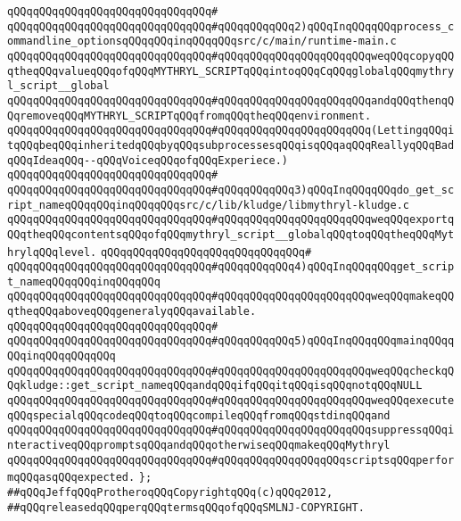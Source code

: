 \verb|qQQqqQQqqQQqqQQqqQQqqQQqqQQqqQQq#|\newline
\verb|qQQqqQQqqQQqqQQqqQQqqQQqqQQqqQQq#qQQqqQQqqQQq2)qQQqInqQQqqQQqprocess_commandline_optionsqQQqqQQqinqQQqqQQqsrc/c/main/runtime-main.c|\newline
\verb|qQQqqQQqqQQqqQQqqQQqqQQqqQQqqQQq#qQQqqQQqqQQqqQQqqQQqqQQqweqQQqcopyqQQqtheqQQqvalueqQQqofqQQqMYTHRYL_SCRIPTqQQqintoqQQqCqQQqglobalqQQqmythryl_script__global|\newline
\verb|qQQqqQQqqQQqqQQqqQQqqQQqqQQqqQQq#qQQqqQQqqQQqqQQqqQQqqQQqandqQQqthenqQQqremoveqQQqMYTHRYL_SCRIPTqQQqfromqQQqtheqQQqenvironment.|\newline
\verb|qQQqqQQqqQQqqQQqqQQqqQQqqQQqqQQq#qQQqqQQqqQQqqQQqqQQqqQQq(LettingqQQqitqQQqbeqQQqinheritedqQQqbyqQQqsubprocessesqQQqisqQQqaqQQqReallyqQQqBadqQQqIdeaqQQq--qQQqVoiceqQQqofqQQqExperiece.)|\newline
\verb|qQQqqQQqqQQqqQQqqQQqqQQqqQQqqQQq#|\newline
\verb|qQQqqQQqqQQqqQQqqQQqqQQqqQQqqQQq#qQQqqQQqqQQq3)qQQqInqQQqqQQqdo_get_script_nameqQQqqQQqinqQQqqQQqsrc/c/lib/kludge/libmythryl-kludge.c|\newline
\verb|qQQqqQQqqQQqqQQqqQQqqQQqqQQqqQQq#qQQqqQQqqQQqqQQqqQQqqQQqweqQQqexportqQQqtheqQQqcontentsqQQqofqQQqmythryl_script__globalqQQqtoqQQqtheqQQqMythrylqQQqlevel.|\newline
\verb|qQQqqQQqqQQqqQQqqQQqqQQqqQQqqQQq#|\newline
\verb|qQQqqQQqqQQqqQQqqQQqqQQqqQQqqQQq#qQQqqQQqqQQq4)qQQqInqQQqqQQqget_script_nameqQQqqQQqinqQQqqQQq|\newline
\verb|qQQqqQQqqQQqqQQqqQQqqQQqqQQqqQQq#qQQqqQQqqQQqqQQqqQQqqQQqweqQQqmakeqQQqtheqQQqaboveqQQqgeneralyqQQqavailable.|\newline
\verb|qQQqqQQqqQQqqQQqqQQqqQQqqQQqqQQq#|\newline
\verb|qQQqqQQqqQQqqQQqqQQqqQQqqQQqqQQq#qQQqqQQqqQQq5)qQQqInqQQqqQQqmainqQQqqQQqinqQQqqQQqqQQq|\newline
\verb|qQQqqQQqqQQqqQQqqQQqqQQqqQQqqQQq#qQQqqQQqqQQqqQQqqQQqqQQqweqQQqcheckqQQqkludge::get_script_nameqQQqandqQQqifqQQqitqQQqisqQQqnotqQQqNULL|\newline
\verb|qQQqqQQqqQQqqQQqqQQqqQQqqQQqqQQq#qQQqqQQqqQQqqQQqqQQqqQQqweqQQqexecuteqQQqspecialqQQqcodeqQQqtoqQQqcompileqQQqfromqQQqstdinqQQqand|\newline
\verb|qQQqqQQqqQQqqQQqqQQqqQQqqQQqqQQq#qQQqqQQqqQQqqQQqqQQqqQQqsuppressqQQqinteractiveqQQqpromptsqQQqandqQQqotherwiseqQQqmakeqQQqMythryl|\newline
\verb|qQQqqQQqqQQqqQQqqQQqqQQqqQQqqQQq#qQQqqQQqqQQqqQQqqQQqscriptsqQQqperformqQQqasqQQqexpected.|\newline
\verb|};|\newline
\newline
\newline
\newline
\verb|##qQQqJeffqQQqProtheroqQQqCopyrightqQQq(c)qQQq2012,|\newline
\verb|##qQQqreleasedqQQqperqQQqtermsqQQqofqQQqSMLNJ-COPYRIGHT.|\newline


